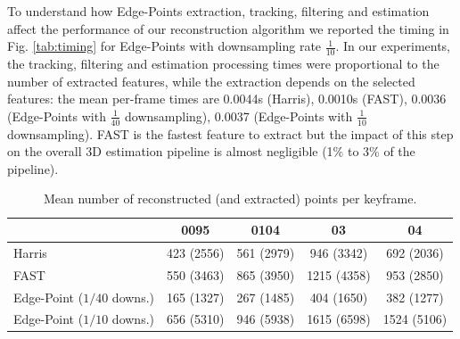 To understand how Edge-Points extraction, tracking, filtering and estimation affect the performance of our reconstruction algorithm we reported the timing in Fig. \ref{tab:timing} for Edge-Points with downsampling rate $\frac{1}{10}$.
In our experiments, the tracking, filtering and estimation processing times were proportional to the number of extracted features, while the extraction depends on the selected features: the mean per-frame times are 0.0044s (Harris),  0.0010s (FAST),  0.0036 (Edge-Points with $\frac{1}{40}$ downsampling),  0.0037 (Edge-Points with $\frac{1}{10}$ downsampling). FAST is the fastest feature to extract but the impact of this step on the overall 3D estimation pipeline is almost negligible (1\% to 3\% of the pipeline).



\begin{table}[t]
  \caption{Mean number of reconstructed (and extracted) points per keyframe.}
  \scriptsize
   \label{tab:reconstrPt}
   \centering
   \begin{tabular}{p{}cccc}
   \toprule 
                                              & 0095            & 0104        &  03         & 04   \\
   \hline   
   {Harris}                                   & 423 (2556)      & 561 (2979)  & 946 (3342)  & 692 (2036) \\
   {FAST}                                     & 550 (3463)      & 865 (3950)  & 1215 (4358) & 953 (2850) \\
  {Edge-Point (${1}/{40}$ downs.)}   & 165 (1327)      & 267 (1485)  & 404 (1650)  & 382 (1277) \\
   {Edge-Point (${1}/{10}$ downs.)}  & 656 (5310)      & 946 (5938)  & 1615 (6598) & 1524 (5106)  \\
    \bottomrule
  \end{tabular}
  \end{table} 
  


